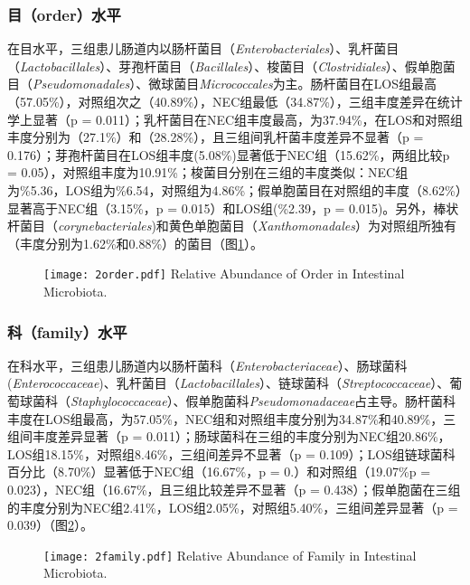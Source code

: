 {{    \subsubsection{目（order）水平}
    在目水平，三组患儿肠道内以肠杆菌目（\textit{Enterobacteriales}）、乳杆菌目（\textit{Lactobacillales}）、芽孢杆菌目（\textit{Bacillales}）、梭菌目（\textit{Clostridiales}）、假单胞菌目（\textit{Pseudomonadales}）、微球菌目\textit{Micrococcales}为主。肠杆菌目在LOS组最高（57.05\%），对照组次之（40.89\%），NEC组最低（34.87\%），三组丰度差异在统计学上显著（p = 0.011）；乳杆菌目在NEC组丰度最高，为37.94\%，在LOS和对照组丰度分别为（27.1\%）和（28.28\%），且三组间乳杆菌丰度差异不显著（p = 0.176）；芽孢杆菌目在LOS组丰度(5.08\%)显著低于NEC组（15.62\%，两组比较p = 0.05），对照组丰度为10.91\%；梭菌目分别在三组的丰度类似：NEC组为\%5.36，LOS组为\%6.54，对照组为4.86\%；假单胞菌目在对照组的丰度（8.62\%）显著高于NEC组（3.15\%，p = 0.015）和LOS组(\%2.39，p = 0.015)。另外，棒状杆菌目（\textit{corynebacteriales})和黄色单胞菌目（\textit{Xanthomonadales}）为对照组所独有（丰度分别为1.62\%和0.88\%）的菌目（图\ref{fig:2order}）。
      \begin{figure}[!htp]
        \centering
        \texttt{[image: 2order.pdf]}
          {Relative Abundance of Order in Intestinal Microbiota.}
        \label{fig:2order}
      \end{figure}

    \subsubsection{科（family）水平}
    在科水平，三组患儿肠道内以肠杆菌科（\textit{Enterobacteriaceae}）、肠球菌科(\textit{Enterococcaceae})、乳杆菌目（\textit{Lactobacillales}）、链球菌科（\textit{Streptococcaceae}）、葡萄球菌科（\textit{Staphylococcaceae}）、假单胞菌科\textit{Pseudomonadaceae}占主导。肠杆菌科丰度在LOS组最高，为57.05\%，NEC组和对照组丰度分别为34.87\%和40.89\%，三组间丰度差异显著（p = 0.011）；肠球菌科在三组的丰度分别为NEC组20.86\%，LOS组18.15\%，对照组8.46\%，三组间差异不显著（p = 0.109）；LOS组链球菌科百分比（8.70\%）显著低于NEC组（16.67\%，p = 0.）和对照组（19.07\%p = 0.023），NEC组（16.67\%，且三组比较差异不显著（p = 0.438）；假单胞菌在三组的丰度分别为NEC组2.41\%，LOS组2.05\%，对照组5.40\%，三组间差异显著（p = 0.039）（图\ref{fig:2family}）。
      \begin{figure}[!htp]
        \centering
        \texttt{[image: 2family.pdf]}
          {Relative Abundance of Family in Intestinal Microbiota.}
        \label{fig:2family}
      \end{figure}

}}
